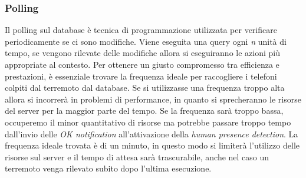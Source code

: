 \documentclass[main.tex]{subfiles}
\begin{document}
 \subsubsection{Polling}
Il polling sul database è tecnica di programmazione utilizzata per verificare periodicamente se ci sono modifiche. Viene eseguita una query ogni \emph{n} unità di tempo, se vengono rilevate delle modifiche allora si eseguiranno le azioni più appropriate al contesto.\newline
Per ottenere un giusto compromesso tra efficienza e prestazioni, è essenziale trovare la frequenza ideale per raccogliere i telefoni colpiti dal terremoto dal database. Se si utilizzasse una frequenza troppo alta allora si incorrerà in problemi di performance, in quanto si sprecheranno le risorse del server per la maggior parte del tempo. \newline
Se la frequenza sarà troppo bassa, occuperemo il minor quantitativo di risorse ma potrebbe passare troppo tempo dall'invio delle \emph{OK notification} all'attivazione della \emph{human presence detection}. La frequenza ideale trovata è di un minuto, in questo modo si limiterà l'utilizzo delle risorse sul server e il tempo di attesa sarà trascurabile, anche nel caso un terremoto venga rilevato subito dopo l'ultima esecuzione.
\end{document}
